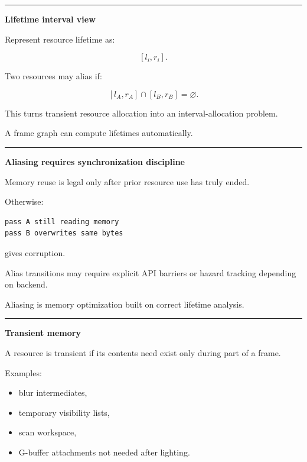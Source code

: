 \begin{center}\rule{0.5\linewidth}{0.5pt}\end{center}

\textbf{Lifetime interval view}

Represent resource lifetime as:

\[
[l_i,r_i].
\]

Two resources may alias if:

\[
[l_A,r_A]
\cap
[l_B,r_B]
=
\varnothing.
\]

This turns transient resource allocation into an interval-allocation problem.

A frame graph can compute lifetimes automatically.

\begin{center}\rule{0.5\linewidth}{0.5pt}\end{center}

\textbf{Aliasing requires synchronization discipline}

Memory reuse is legal only after prior resource use has truly ended.

Otherwise:

\protect{}\label{p10-alias-bug}%
\begin{verbatim}
pass A still reading memory
pass B overwrites same bytes
\end{verbatim}

gives corruption.

Alias transitions may require explicit API barriers or hazard tracking depending on backend.

Aliasing is memory optimization built on correct lifetime analysis.

\begin{center}\rule{0.5\linewidth}{0.5pt}\end{center}

\textbf{Transient memory}

A resource is transient if its contents need exist only during part of a frame.

Examples:

\begin{itemize}
\tightlist
\item
  blur intermediates,
\item
  temporary visibility lists,
\item
  scan workspace,
\item
  G-buffer attachments not needed after lighting.
\end{itemize}

